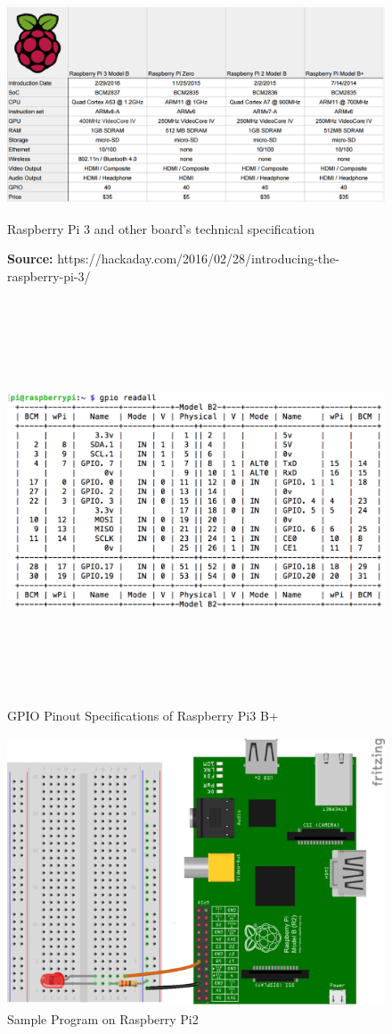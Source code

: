 \documentclass[12pt,a4paper]{article}
\begin{document}
\begin{figure}[p]
\centering
\includegraphics[width=1.3\textwidth, angle=90 ]{Introduction/12.png}
\caption{Raspberry Pi 3 and other board’s technical specification}
\caption*{\textbf{Source:} https://hackaday.com/2016/02/28/introducing-the-raspberry-pi-3/}
\end{figure}
\begin{figure}[h!]
    \centering
	\includegraphics[width=15cm, height=12cm]{Introduction/14.png}
	\caption{GPIO Pinout Specifications of Raspberry Pi3 B+}
\end{figure}
\begin{figure}[h!]
    \centering
	\includegraphics[width=12cm, height=8cm]{Introduction/15.png}
	\caption{Sample Program on Raspberry Pi2}
\end{figure}
\end{document}
